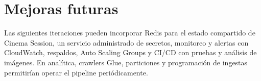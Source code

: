 \chapter{Mejoras futuras}
Las siguientes iteraciones pueden incorporar Redis para el estado compartido de Cinema Session, un servicio administrado de secretos, monitoreo y alertas con CloudWatch, respaldos, Auto Scaling Groups y CI/CD con pruebas y análisis de imágenes. En analítica, crawlers Glue, particiones y programación de ingestas permitirían operar el pipeline periódicamente.

